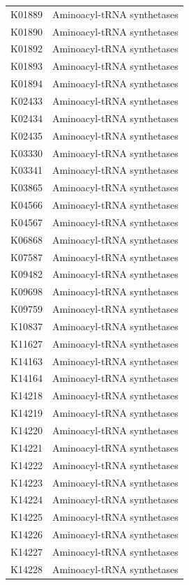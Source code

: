 \begin{longtable}{@{}l l@{}}
K01889 & Aminoacyl-tRNA synthetases \\
K01890 & Aminoacyl-tRNA synthetases \\
K01892 & Aminoacyl-tRNA synthetases \\
K01893 & Aminoacyl-tRNA synthetases \\
K01894 & Aminoacyl-tRNA synthetases \\
K02433 & Aminoacyl-tRNA synthetases \\
K02434 & Aminoacyl-tRNA synthetases \\
K02435 & Aminoacyl-tRNA synthetases \\
K03330 & Aminoacyl-tRNA synthetases \\
K03341 & Aminoacyl-tRNA synthetases \\
K03865 & Aminoacyl-tRNA synthetases \\
K04566 & Aminoacyl-tRNA synthetases \\
K04567 & Aminoacyl-tRNA synthetases \\
K06868 & Aminoacyl-tRNA synthetases \\
K07587 & Aminoacyl-tRNA synthetases \\
K09482 & Aminoacyl-tRNA synthetases \\
K09698 & Aminoacyl-tRNA synthetases \\
K09759 & Aminoacyl-tRNA synthetases \\
K10837 & Aminoacyl-tRNA synthetases \\
K11627 & Aminoacyl-tRNA synthetases \\
K14163 & Aminoacyl-tRNA synthetases \\
K14164 & Aminoacyl-tRNA synthetases \\
K14218 & Aminoacyl-tRNA synthetases \\
K14219 & Aminoacyl-tRNA synthetases \\
K14220 & Aminoacyl-tRNA synthetases \\
K14221 & Aminoacyl-tRNA synthetases \\
K14222 & Aminoacyl-tRNA synthetases \\
K14223 & Aminoacyl-tRNA synthetases \\
K14224 & Aminoacyl-tRNA synthetases \\
K14225 & Aminoacyl-tRNA synthetases \\
K14226 & Aminoacyl-tRNA synthetases \\
K14227 & Aminoacyl-tRNA synthetases \\
K14228 & Aminoacyl-tRNA synthetases \\

\end{longtable}
